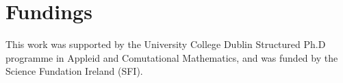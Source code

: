 \chapter{Fundings}

\vfill
\begin{center}
\begin{minipage}{.7\linewidth}

This work was supported by the University College Dublin Structured Ph.D programme in Appleid and Comutational Mathematics, and was funded by the Science Fundation Ireland (SFI).

\end{minipage}
\end{center}
\vfill